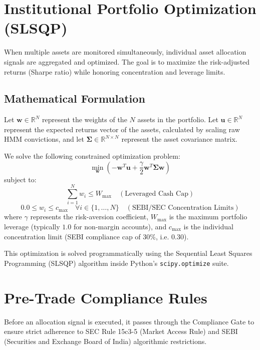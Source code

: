 \documentclass[11pt,a4paper]{article}
\begin{document}
\newpage
\section{Institutional Portfolio Optimization (SLSQP)}

When multiple assets are monitored simultaneously, individual asset allocation signals are aggregated and optimized. The goal is to maximize the risk-adjusted returns (Sharpe ratio) while honoring concentration and leverage limits.

\subsection{Mathematical Formulation}

Let $\mathbf{w} \in \mathbb{R}^N$ represent the weights of the $N$ assets in the portfolio. Let $\mathbf{u} \in \mathbb{R}^N$ represent the expected returns vector of the assets, calculated by scaling raw HMM convictions, and let $\boldsymbol{\Sigma} \in \mathbb{R}^{N \times N}$ represent the asset covariance matrix.

We solve the following constrained optimization problem:
\begin{equation}
    \min_{\mathbf{w}} \left( -\mathbf{w}^T \mathbf{u} + \frac{\gamma}{2} \mathbf{w}^T \boldsymbol{\Sigma} \mathbf{w} \right)
\end{equation}
subject to:
\begin{equation}
    \sum_{i=1}^N w_i \le W_{\text{max}} \quad (\text{Leveraged Cash Cap})
\end{equation}
\begin{equation}
    0.0 \le w_i \le c_{\text{max}} \quad \forall i \in \{1, \dots, N\} \quad (\text{SEBI/SEC Concentration Limits})
\end{equation}
where $\gamma$ represents the risk-aversion coefficient, $W_{\text{max}}$ is the maximum portfolio leverage (typically $1.0$ for non-margin accounts), and $c_{\text{max}}$ is the individual concentration limit (SEBI compliance cap of 30\%, i.e. $0.30$).

This optimization is solved programmatically using the Sequential Least Squares Programming (SLSQP) algorithm inside Python's \texttt{scipy.optimize} suite.

\newpage
\section{Pre-Trade Compliance Rules}

Before an allocation signal is executed, it passes through the Compliance Gate to ensure strict adherence to SEC Rule 15c3-5 (Market Access Rule) and SEBI (Securities and Exchange Board of India) algorithmic restrictions.
\end{document}
